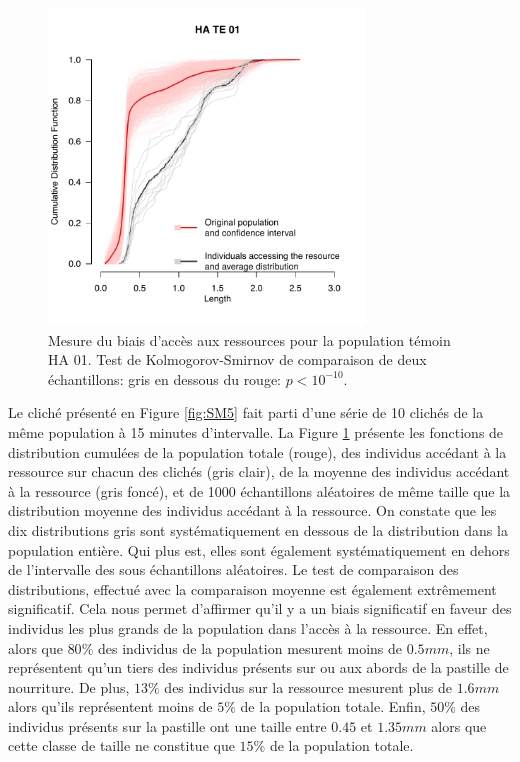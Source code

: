 \begin{figure}[!ht]
\begin{center}
\includegraphics[width=0.75\textwidth]{1_CorpsDeThese/Resumes/Fig/SM06}
\caption[Mesure du biais
d'accès aux ressources]{Mesure du biais
d'accès aux ressources pour la population témoin HA 01. Test de
Kolmogorov-Smirnov de comparaison de deux échantillons: gris en dessous du
rouge: $p<10^{-10}$.}
\label{fig:SM6}
\end{center}
\end{figure}

Le cliché présenté en Figure \ref{fig:SM5} fait parti d'une série de 10 clichés
de la même population à 15 minutes d'intervalle. La Figure \ref{fig:SM6}
présente les fonctions de distribution cumulées de la population totale (rouge),
des individus accédant à la ressource sur chacun des clichés (gris clair), de la
moyenne des individus accédant à la ressource (gris foncé), et de 1000
échantillons aléatoires de même taille que la distribution moyenne des individus
accédant à la ressource. On constate que les dix distributions gris sont
systématiquement en dessous de la distribution dans la population entière. Qui
plus est, elles sont également systématiquement en dehors de l'intervalle des
sous échantillons aléatoires. Le test de comparaison des distributions,
effectué avec la comparaison moyenne est également extrêmement significatif.
Cela nous permet d'affirmer qu'il y a un biais significatif en faveur des
individus les plus grands de la population dans l'accès à la ressource. En
effet, alors que $80\%$ des individus de la population mesurent moins de
$0.5mm$, ils ne représentent qu'un tiers des individus présents sur ou aux
abords de la pastille de nourriture. De plus, $13\%$ des individus sur la
ressource mesurent plus de $1.6mm$ alors qu'ils représentent moins de $5\%$ de
la population totale. Enfin, $50\%$ des individus présents sur la pastille ont
une taille entre $0.45$ et $1.35mm$ alors que cette classe de taille ne
constitue que $15\%$ de la population totale.

